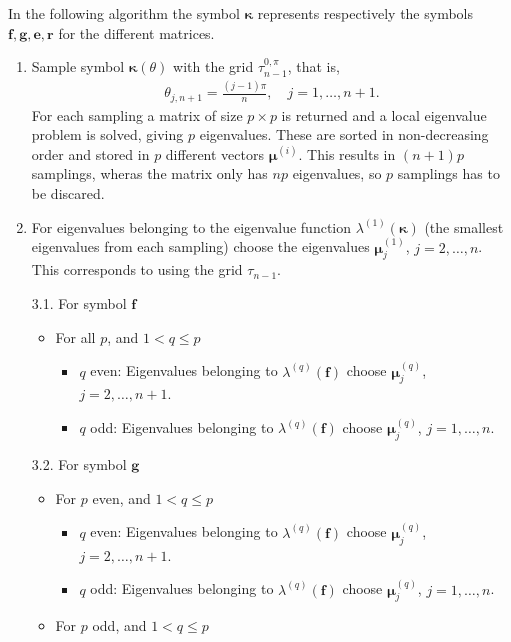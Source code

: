 \documentclass[10pt]{article}
\begin{document}
In the following algorithm the symbol $\boldsymbol{\kappa}$ represents respectively the symbols $\mathbf{f},\mathbf{g},\mathbf{e},\mathbf{r}$ for the different matrices.
\begin{enumerate}
\item Sample symbol $\boldsymbol{\kappa}(\theta)$ with the grid $\tau_{n-1}^{0,\pi}$, that is,
\begin{align}
\theta_{j,n+1}=\frac{(j-1)\pi}{n},\quad j=1,\ldots, n+1.
\end{align}
For each sampling a matrix of size $p\times p$ is returned and a local eigenvalue problem is solved, giving $p$ eigenvalues. These are sorted in non-decreasing order and stored in $p$ different vectors $\boldsymbol{\mu}^{(i)}$. This results in $(n+1)p$ samplings, wheras the matrix only has $np$ eigenvalues, so $p$ samplings has to be discared.
\item For eigenvalues belonging to the eigenvalue function $\lambda^{(1)}(\mathbf{\boldsymbol{\kappa}})$ (the smallest eigenvalues from each sampling) choose the eigenvalues $\boldsymbol{\mu}_j^{(1)}$, $j=2,\ldots, n$. This corresponds to using the grid $\tau_{n-1}$.
\item[3.1.] For symbol $\mathbf{f}$ 
\begin{itemize}
	\item For all $p$, and $1<q\leq p$
\begin{itemize}
\item $q$ even: Eigenvalues belonging to $\lambda^{(q)}(\mathbf{f})$ choose $\boldsymbol{\mu}_j^{(q)}$, $j=2,\ldots, n+1$.
\item $q$ odd: Eigenvalues belonging to $\lambda^{(q)}(\mathbf{f})$ choose $\boldsymbol{\mu}_j^{(q)}$, $j=1,\ldots, n$.
\end{itemize}
\end{itemize}
\item[3.2.] For symbol $\mathbf{g}$
\begin{itemize}
\item For $p$ even, and $1<q\leq p$ 
\begin{itemize}
\item $q$ even: Eigenvalues belonging to $\lambda^{(q)}(\mathbf{f})$ choose $\boldsymbol{\mu}_j^{(q)}$, $j=2,\ldots, n+1$.
\item $q$ odd: Eigenvalues belonging to $\lambda^{(q)}(\mathbf{f})$ choose $\boldsymbol{\mu}_j^{(q)}$, $j=1,\ldots, n$.
\end{itemize}
\item For $p$ odd, and $1<q\leq p$



\end{itemize}
\end{enumerate}
\end{document}
